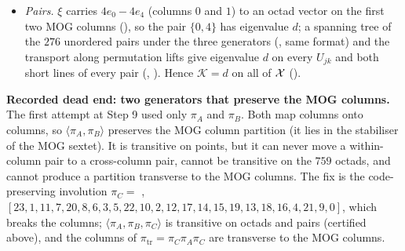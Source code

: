 \begin{itemize}
  eigenvalue (), so every octad block has eigenvalue $d$ ().
\item \emph{Pairs.}  $\xi$ carries $4e_0-4e_4$ (columns $0$ and $1$) to an octad vector on the first two MOG columns
  (), so the pair $\{0,4\}$ has eigenvalue $d$; a spanning tree of the $276$ unordered
  pairs under the three generators (, same format) and the transport along permutation lifts give
  eigenvalue $d$ on every $U_{jk}$ and both short lines of every pair (,
  ).  Hence $\mathcal K=d$ on all of $\mathcal{X}$ ().
\end{itemize}

\begin{warning}
\textbf{Recorded dead end: two generators that preserve the MOG columns.}  The first attempt at Step 9 used only
$\pi_A$ and $\pi_B$.  Both map columns onto columns, so $\langle\pi_A,\pi_B\rangle$ preserves the MOG column partition (it lies in
the stabiliser of the MOG sextet).  It is transitive on points, but it can never move a within-column pair to a cross-column
pair, cannot be transitive on the $759$ octads, and cannot produce a partition transverse to the MOG columns.  The fix is the
code-preserving involution $\pi_C=$ ,
$[23,1,11,7,20,8,6,3,5,22,10,2,12,17,14,15,19,13,18,16,4,21,9,0]$, which breaks the columns; $\langle\pi_A,\pi_B,\pi_C\rangle$ is
transitive on octads and pairs (certified above), and the columns of $\pi_{\mathrm{tr}}=\pi_C\pi_A\pi_C$ are transverse to the MOG
columns.
\end{warning}

